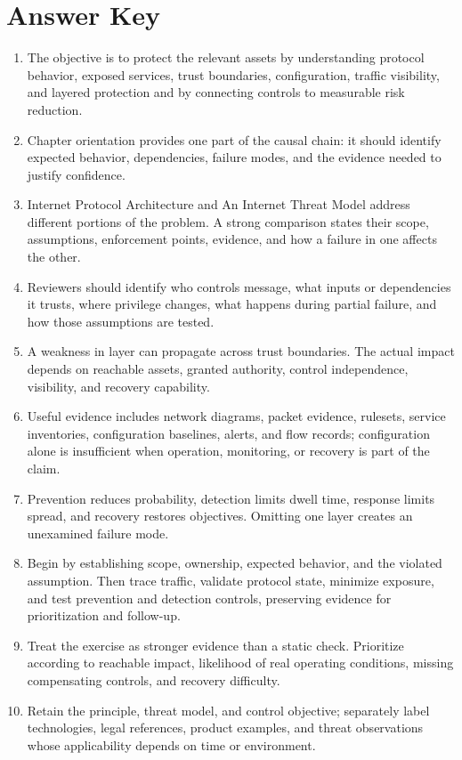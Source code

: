 \documentclass[11pt,letterpaper]{article}
\begin{document}
\section*{Answer Key}
\begin{enumerate}
\item The objective is to protect the relevant assets by understanding protocol behavior, exposed services, trust boundaries, configuration, traffic visibility, and layered protection and by connecting controls to measurable risk reduction.
\item Chapter orientation provides one part of the causal chain: it should identify expected behavior, dependencies, failure modes, and the evidence needed to justify confidence.
\item Internet Protocol Architecture and An Internet Threat Model address different portions of the problem. A strong comparison states their scope, assumptions, enforcement points, evidence, and how a failure in one affects the other.
\item Reviewers should identify who controls message, what inputs or dependencies it trusts, where privilege changes, what happens during partial failure, and how those assumptions are tested.
\item A weakness in layer can propagate across trust boundaries. The actual impact depends on reachable assets, granted authority, control independence, visibility, and recovery capability.
\item Useful evidence includes network diagrams, packet evidence, rulesets, service inventories, configuration baselines, alerts, and flow records; configuration alone is insufficient when operation, monitoring, or recovery is part of the claim.
\item Prevention reduces probability, detection limits dwell time, response limits spread, and recovery restores objectives. Omitting one layer creates an unexamined failure mode.
\item Begin by establishing scope, ownership, expected behavior, and the violated assumption. Then trace traffic, validate protocol state, minimize exposure, and test prevention and detection controls, preserving evidence for prioritization and follow-up.
\item Treat the exercise as stronger evidence than a static check. Prioritize according to reachable impact, likelihood of real operating conditions, missing compensating controls, and recovery difficulty.
\item Retain the principle, threat model, and control objective; separately label technologies, legal references, product examples, and threat observations whose applicability depends on time or environment.
\end{enumerate}
\end{document}
